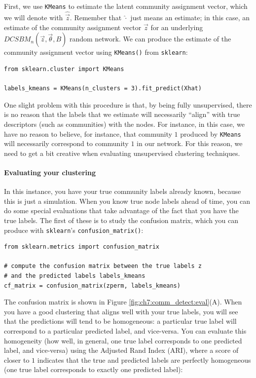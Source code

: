 First, we use \texttt{KMeans} to estimate the latent community assignment vector, which we will denote with $\hat{\vec z}$. Remember that $\hat\cdot$ just means an estimate; in this case, an estimate of the community assignment vector $\vec z$ for an underlying $DCSBM_n(\vec z, \vec \theta, B)$ random network. We can produce the estimate of the community assignment vector using \texttt{KMeans()} from \texttt{sklearn}:

\begin{lstlisting}[style=python]
from sklearn.cluster import KMeans

labels_kmeans = KMeans(n_clusters = 3).fit_predict(Xhat)
\end{lstlisting}

One slight problem with this procedure is that, by being fully unsupervised, there is no reason that the labels that we estimate will necessarily ``align'' with true descriptors (such as communities) with the nodes. For instance, in this case, we have no reason to believe, for instance, that community $1$ produced by \texttt{KMeans} will necessarily correspond to community $1$ in our network. For this reason, we need to get a bit creative when evaluating unsupervised clustering techniques.

\paragraph{Evaluating your clustering}
\label{ch7:comm_detect:eval}

In this instance, you have your true community labels already known, because this is just a simulation. When you know true node labels ahead of time, you can do some special evaluations that take advantage of the fact that you have the true labels. The first of these is to study the confusion matrix, which you can produce with \texttt{sklearn}'s \texttt{confusion\_matrix()}:

\begin{lstlisting}[style=python]
from sklearn.metrics import confusion_matrix

# compute the confusion matrix between the true labels z
# and the predicted labels labels_kmeans
cf_matrix = confusion_matrix(zperm, labels_kmeans)
\end{lstlisting}

The confusion matrix is shown in Figure \ref{fig:ch7:comm_detect:eval}(A). When you have a good clustering that aligns well with your true labels, you will see that the predictions will tend to be homogeneous: a particular true label will correspond to a particular predicted label, and vice-versa. You can evaluate this homogeneity (how well, in general, one true label corresponds to one predicted label, and vice-versa) using the Adjusted Rand Index (ARI), where a score of closer to $1$ indicates that the true and predicted labels are perfectly homogeneous (one true label corresponds to exactly one predicted label):

